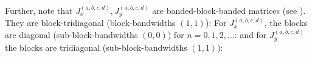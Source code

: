 Further, note that $J_x^{(a,b,c,d)}, J_y^{(a,b,c,d)}$ are banded-block-banded matrices (see ). They are block-tridiagonal (block-bandwidths $(1,1)$):
For $J_x^{(a,b,c,d)}$, the blocks are diagonal (sub-block-bandwidths $(0,0)$) for $n = 0,1,2,\dots$:
and for $J_y^{(a,b,c,d)}$ the blocks are tridiagonal (sub-block-bandwidths $(1,1)$):
